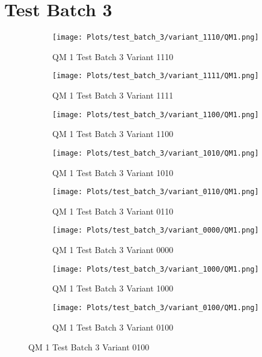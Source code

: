 \documentclass{DissertateFigs}
\begin{document}
\section{Test Batch 3}
\begin{figure}[t!]
    \begin{subfigure}{0.47\textwidth}
    \texttt{[image: Plots/test\_batch\_3/variant\_1110/QM1.png]}
    \caption{QM 1 Test Batch 3 Variant 1110}
    \end{subfigure}
    \begin{subfigure}{0.47\textwidth}
    \texttt{[image: Plots/test\_batch\_3/variant\_1111/QM1.png]}
    \caption{QM 1 Test Batch 3 Variant 1111}
    \end{subfigure}

\medskip

    \begin{subfigure}{0.47\textwidth}
    \texttt{[image: Plots/test\_batch\_3/variant\_1100/QM1.png]}
    \caption{QM 1 Test Batch 3 Variant 1100}
    \end{subfigure}
    \begin{subfigure}{0.47\textwidth}
    \texttt{[image: Plots/test\_batch\_3/variant\_1010/QM1.png]}
    \caption{QM 1 Test Batch 3 Variant 1010}
    \end{subfigure}

\medskip

    \begin{subfigure}{0.47\textwidth}
    \texttt{[image: Plots/test\_batch\_3/variant\_0110/QM1.png]}
    \caption{QM 1 Test Batch 3 Variant 0110}
    \end{subfigure}
    \begin{subfigure}{0.47\textwidth}
    \texttt{[image: Plots/test\_batch\_3/variant\_0000/QM1.png]}
    \caption{QM 1 Test Batch 3 Variant 0000}
    \end{subfigure}

\medskip

    \begin{subfigure}{0.47\textwidth}
    \texttt{[image: Plots/test\_batch\_3/variant\_1000/QM1.png]}
    \caption{QM 1 Test Batch 3 Variant 1000}
    \end{subfigure}
    \begin{subfigure}{0.47\textwidth}
    \texttt{[image: Plots/test\_batch\_3/variant\_0100/QM1.png]}
    \caption{QM 1 Test Batch 3 Variant 0100}
    \end{subfigure}


\end{figure}
\end{document}
